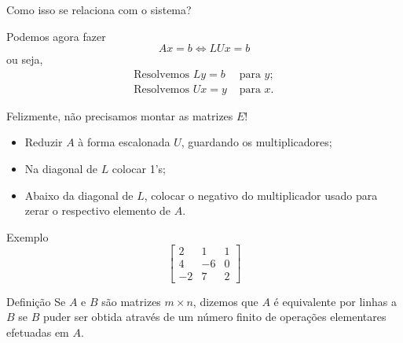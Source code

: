\documentclass{beamer}
\begin{document}
\begin{darkframes}
\begin{frame}{Como isso se relaciona com o sistema?}
	
Podemos agora fazer
\begin{equation*}
	Ax = b \Leftrightarrow LUx = b
\end{equation*}
\vskip-0.5cm
ou seja,
\vskip-0.5cm
\begin{align*}
  \mbox{Resolvemos } Ly = b &\mbox{ para } y;\\
  \mbox{Resolvemos } Ux = y &\mbox{ para } x.
\end{align*}

Felizmente, não precisamos montar as matrizes $E$! 
\begin{itemize}
  \item Reduzir $A$ à forma escalonada $U$, guardando os multiplicadores;
	\item Na diagonal de $L$ colocar 1's;
	\item Abaixo da diagonal de $L$, colocar o negativo do multiplicador usado para zerar o respectivo elemento de $A$.
\end{itemize}
\end{frame}


\begin{frame}{Exemplo}
	\begin{equation*}
	   \begin{bmatrix} 2&1&1\\4&-6&0\\-2&7&2 \end{bmatrix} 
	\end{equation*}

\end{frame}

\begin{frame}{}
\begin{block}{Definição}
  Se $A$ e $B$ são matrizes $m\times n$, dizemos que $A$ é
equivalente por linhas a $B$ se $B$ puder ser obtida através de um
número finito de operações elementares efetuadas em $A$.
\end{block}


\end{frame}
\end{darkframes}
\end{document}
